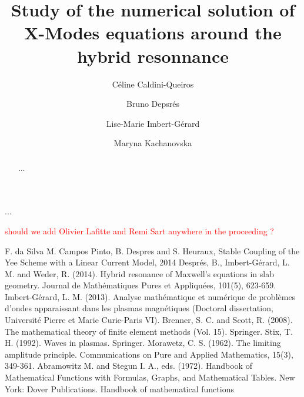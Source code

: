 \documentclass[proc]{edpsmath}
\begin{document}
\newcommand{\urev}[1]{{\color{red}#1}}
\newcommand{\mrev}[1]{{\color{blue}#1}}

\title{Study of the
	numerical solution of X-Modes equations around the hybrid resonnance} %
%
\author{C\'eline Caldini-Queiros}\address{Max Planck Institute für PlasmaPhysik, Garching bei Muenchen}
\author{Bruno Depsr\'es}\address{Laboratoire Jacques-Louis Lions, University PARIS 6}
\author{Lise-Marie Imbert-Gérard}\address{Courant Institute of Mathematical Sciences, New York University}
\author{Maryna Kachanovska}\address{POEMS, INRIA, ENSTA ParisTech, Paris}


%
%
\begin{abstract} ... \end{abstract}
%
\begin{resume} ... \end{resume}
%
%
\maketitle
\textcolor{red}{should we add Olivier Lafitte and Remi Sart anywhere in the proceeding ?}\\

%









\begin{thebibliography}{99}
 F. da Silva M. Campos Pinto, B. Despres and S. Heuraux, Stable Coupling of the Yee Scheme with a Linear Current Model,
2014
 Després, B., Imbert-Gérard, L. M. and Weder, R. (2014). Hybrid resonance of Maxwell's equations in slab geometry. Journal de Mathématiques Pures et Appliquées, 101(5), 623-659.
 Imbert-Gérard, L. M. (2013). Analyse mathématique et numérique de problèmes d'ondes apparaissant dans les plasmas magnétiques (Doctoral dissertation, Université Pierre et Marie Curie-Paris VI).
 Brenner, S. C. and Scott, R. (2008). The mathematical theory of finite element methods (Vol. 15). Springer.
 Stix, T. H. (1992). Waves in plasmas. Springer.
 Morawetz, C. S. (1962). The limiting amplitude principle. Communications on Pure and Applied Mathematics, 15(3), 349-361.
 Abramowitz M. and Stegun I. A., eds. (1972). Handbook of Mathematical Functions with Formulas, Graphs, and Mathematical Tables. New York: Dover Publications.
Handbook of mathematical functions
\end{thebibliography}
\end{document}
